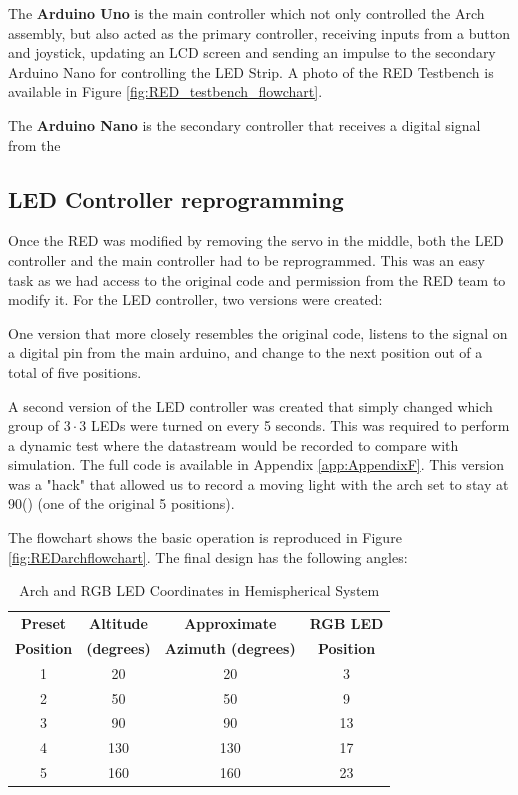 The \textbf{Arduino Uno} is the main controller which not only controlled the Arch assembly, but also acted as the primary controller, receiving inputs from a button and joystick, updating an LCD screen and sending an impulse to the secondary Arduino Nano for controlling the LED Strip. A photo of the \ac{RED} Testbench is available in Figure \ref{fig:RED_testbench_flowchart}.

The \textbf{Arduino Nano} is the secondary controller that receives a digital signal from the 

\subsection{LED Controller reprogramming}
Once the \ac{RED} was modified by removing the servo in the middle, both the LED controller and the  main controller had to be reprogrammed. This was an easy task as we had access to the original code and permission from the RED \cite{RefWorks:shopov2022renewable} team to modify it. For the LED controller, two versions were created:

One version that more closely resembles the original code, listens to the signal on a digital pin from the main arduino, and change to the next position out of a total of five positions.

A second version of the LED controller was created that simply changed which group of $3 \cdot 3$ LEDs were turned on every 5 seconds. This was required to perform a dynamic test where the datastream would be recorded to compare with simulation. The full code is available in Appendix \ref{app:AppendixF}. This version was a "hack" that allowed us to record a moving light with the arch set to stay at 90\textdegree() (one of the original 5 positions). 

The flowchart shows the basic operation is reproduced in Figure \ref{fig:REDarchflowchart}. The final design has the following angles:

  \begin{table}[htbp]
    \centering
    \caption{Arch and RGB LED Coordinates in Hemispherical System}
    \begin{tabular}{|c|c|c|c|}
    \hline
    \textbf{Preset} & \textbf{Altitude} & \textbf{Approximate} & \textbf{RGB LED} \\
    \textbf{Position} & \textbf{(degrees)} & \textbf{Azimuth (degrees)} & \textbf{Position} \\
    \hline
    1 & 20 & 20 & 3 \\
    \hline
    2 & 50 & 50 & 9 \\
    \hline
    3 & 90 & 90 & 13 \\
    \hline
    4 & 130 & 130 & 17 \\
    \hline
    5 & 160 & 160 & 23 \\
    \hline
    \end{tabular}
    \label{tab:arch-led-positions}
\end{table}

